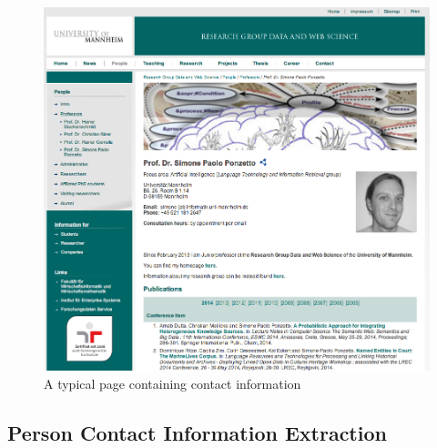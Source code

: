 \documentclass[11pt,titlepage,oneside,openany]{article}
\begin{document}
\begin{figure}[htb]
  \begin{center}
   \includegraphics[width=1.0\textwidth]{figures/contact.png}
  \end{center}
  \caption{A typical page containing contact information}
    \label{fig:contact}
\end{figure}


\subsection{Person Contact Information Extraction}
\end{document}
